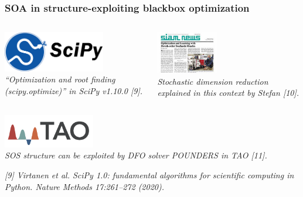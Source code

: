 \documentclass[aspectratio=169]{beamer}
\begin{document}
\begin{frame}\frametitle{SOA in structure-exploiting blackbox optimization}
\begin{columns}
\begin{column}{0.5\textwidth}
\begin{center}
\includegraphics[width=0.7\textwidth]{../img/logos/logo-scipy.png}\\
{\tiny \sl
``Optimization and root finding (scipy.optimize)'' in SciPy v1.10.0 [9].\\
}
\end{center}
\end{column}
\begin{column}{0.5\textwidth}
\begin{center}
\includegraphics[height=5em]{siam_news_feb_23.jpg}\\
{\tiny \sl
Stochastic dimension reduction explained in this context
by Stefan [10].\\
}
\end{center}
\end{column}
\end{columns}

\bigskip

\begin{center}
\includegraphics[width=0.3\textwidth]{../img/logos/logo-tao.png}\\
{\tiny \sl
SOS structure can be exploited by DFO solver POUNDERS in TAO [11].\\
}
\end{center}

\vfill

{\tiny\it
[9] Virtanen et al.
SciPy 1.0: fundamental algorithms for scientific computing in Python.
{\sl Nature Methods 17:261--272 (2020).}\\
}


\end{frame}
\end{document}
